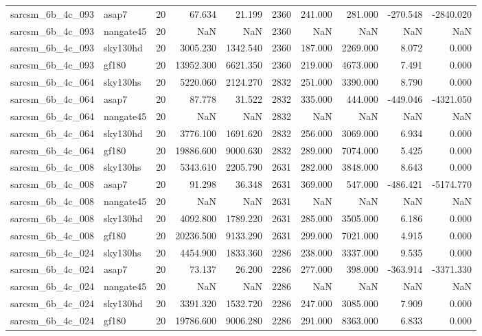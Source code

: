 \documentclass{article}
\begin{document}
\begin{longtable}{llrrrrrrrr}
sarcsm\_6b\_4c\_093 & asap7 & 20 & 67.634 & 21.199 & 2360 & 241.000 & 281.000 & -270.548 & -2840.020 \\
sarcsm\_6b\_4c\_093 & nangate45 & 20 & NaN & NaN & 2360 & NaN & NaN & NaN & NaN \\
sarcsm\_6b\_4c\_093 & sky130hd & 20 & 3005.230 & 1342.540 & 2360 & 187.000 & 2269.000 & 8.072 & 0.000 \\
sarcsm\_6b\_4c\_093 & gf180 & 20 & 13952.300 & 6621.350 & 2360 & 219.000 & 4673.000 & 7.491 & 0.000 \\
sarcsm\_6b\_4c\_064 & sky130hs & 20 & 5220.060 & 2124.270 & 2832 & 251.000 & 3390.000 & 8.790 & 0.000 \\
sarcsm\_6b\_4c\_064 & asap7 & 20 & 87.778 & 31.522 & 2832 & 335.000 & 444.000 & -449.046 & -4321.050 \\
sarcsm\_6b\_4c\_064 & nangate45 & 20 & NaN & NaN & 2832 & NaN & NaN & NaN & NaN \\
sarcsm\_6b\_4c\_064 & sky130hd & 20 & 3776.100 & 1691.620 & 2832 & 256.000 & 3069.000 & 6.934 & 0.000 \\
sarcsm\_6b\_4c\_064 & gf180 & 20 & 19886.600 & 9000.630 & 2832 & 289.000 & 7074.000 & 5.425 & 0.000 \\
sarcsm\_6b\_4c\_008 & sky130hs & 20 & 5343.610 & 2205.790 & 2631 & 282.000 & 3848.000 & 8.643 & 0.000 \\
sarcsm\_6b\_4c\_008 & asap7 & 20 & 91.298 & 36.348 & 2631 & 369.000 & 547.000 & -486.421 & -5174.770 \\
sarcsm\_6b\_4c\_008 & nangate45 & 20 & NaN & NaN & 2631 & NaN & NaN & NaN & NaN \\
sarcsm\_6b\_4c\_008 & sky130hd & 20 & 4092.800 & 1789.220 & 2631 & 285.000 & 3505.000 & 6.186 & 0.000 \\
sarcsm\_6b\_4c\_008 & gf180 & 20 & 20236.500 & 9133.290 & 2631 & 299.000 & 7021.000 & 4.915 & 0.000 \\
sarcsm\_6b\_4c\_024 & sky130hs & 20 & 4454.900 & 1833.360 & 2286 & 238.000 & 3337.000 & 9.535 & 0.000 \\
sarcsm\_6b\_4c\_024 & asap7 & 20 & 73.137 & 26.200 & 2286 & 277.000 & 398.000 & -363.914 & -3371.330 \\
sarcsm\_6b\_4c\_024 & nangate45 & 20 & NaN & NaN & 2286 & NaN & NaN & NaN & NaN \\
sarcsm\_6b\_4c\_024 & sky130hd & 20 & 3391.320 & 1532.720 & 2286 & 247.000 & 3085.000 & 7.909 & 0.000 \\
sarcsm\_6b\_4c\_024 & gf180 & 20 & 19786.600 & 9006.280 & 2286 & 291.000 & 8363.000 & 6.833 & 0.000 \\

\end{longtable}
\end{document}
